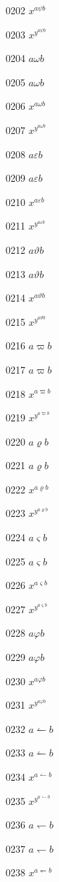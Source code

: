 \documentclass{article}
\begin{document}
0202 $x^{a\psi b}$\par
0203 $x^{y^{a\psi b}}$\par
0204 $a\omega b$\par
0205 $\displaystyle a\omega b$\par
0206 $x^{a\omega b}$\par
0207 $x^{y^{a\omega b}}$\par
0208 $a\varepsilon b$\par
0209 $\displaystyle a\varepsilon b$\par
0210 $x^{a\varepsilon b}$\par
0211 $x^{y^{a\varepsilon b}}$\par
0212 $a\vartheta b$\par
0213 $\displaystyle a\vartheta b$\par
0214 $x^{a\vartheta b}$\par
0215 $x^{y^{a\vartheta b}}$\par
0216 $a\varpi b$\par
0217 $\displaystyle a\varpi b$\par
0218 $x^{a\varpi b}$\par
0219 $x^{y^{a\varpi b}}$\par
0220 $a\varrho b$\par
0221 $\displaystyle a\varrho b$\par
0222 $x^{a\varrho b}$\par
0223 $x^{y^{a\varrho b}}$\par
0224 $a\varsigma b$\par
0225 $\displaystyle a\varsigma b$\par
0226 $x^{a\varsigma b}$\par
0227 $x^{y^{a\varsigma b}}$\par
0228 $a\varphi b$\par
0229 $\displaystyle a\varphi b$\par
0230 $x^{a\varphi b}$\par
0231 $x^{y^{a\varphi b}}$\par
0232 $a\leftharpoonup b$\par
0233 $\displaystyle a\leftharpoonup b$\par
0234 $x^{a\leftharpoonup b}$\par
0235 $x^{y^{a\leftharpoonup b}}$\par
0236 $a\leftharpoondown b$\par
0237 $\displaystyle a\leftharpoondown b$\par
0238 $x^{a\leftharpoondown b}$\par
\end{document}

